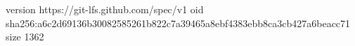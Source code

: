 version https://git-lfs.github.com/spec/v1
oid sha256:a6c2d69136b30082585261b822c7a39465a8ebf4383ebb8ca3cb427a6beacc71
size 1362
